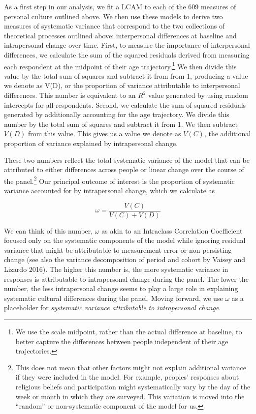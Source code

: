 \documentclass[
  12pt,
]{article}
\begin{document}
As a first step in our analysis, we fit a LCAM to each of the 609
measures of personal culture outlined above. We then use these models to
derive two measures of systematic variance that correspond to the two
collections of theoretical processes outlined above: interpersonal
differences at baseline and intrapersonal change over time. First, to
measure the importance of interpersonal differences, we calculate the
sum of the squared residuals derived from measuring each respondent at
the midpoint of their age trajectory.\footnote{We use the scale
  midpoint, rather than the actual difference at baseline, to better
  capture the differences between people independent of their age
  trajectories.} We then divide this value by the total sum of squares
and subtract it from from 1, producing a value we denote as V(D), or the
proportion of variance attributable to interpersonal differences. This
number is equivalent to an \(R^2\) value generated by using random
intercepts for all respondents. Second, we calculate the sum of squared
residuals generated by additionally accounting for the age trajectory.
We divide this number by the total sum of squares and subtract it from
1. We then subtract \(V(D)\) from this value. This gives us a value we
denote as \(V(C)\), the additional proportion of variance explained by
intrapersonal change.

These two numbers reflect the total systematic variance of the model
that can be attributed to either differences across people or linear
change over the course of the panel.\footnote{This does not mean that
  other factors might not explain additional variance if they were
  included in the model. For example, peoples' responses about religious
  beliefs and participation might systematically vary by the day of the
  week or month in which they are surveyed. This variation is moved into
  the ``random'' or non-systematic component of the model for us.} Our
principal outcome of interest is the proportion of systematic variance
accounted for by intrapersonal change, which we calculate as

\[
\omega = \frac{V(C)}{V(C) + V(D)}
\]

We can think of this number, \(\omega\) as akin to an Intraclass
Correlation Coefficient focused only on the systematic components of the
model while ignoring residual variance that might be attributable to
measurement error or non-persisting change (see also the variance
decomposition of period and cohort by Vaisey and Lizardo 2016). The
higher this number is, the more systematic variance in responses is
attributable to intrapersonal change during the panel. The lower the
number, the less intrapersonal change seems to play a large role in
explaining systematic cultural differences during the panel. Moving
forward, we use \(\omega\) as a placeholder for \emph{systematic
variance attributable to intrapersonal change}.
\end{document}
